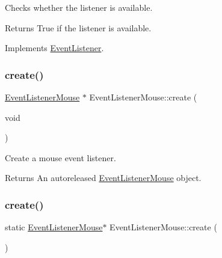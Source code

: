 Checks whether the listener is available.

\begin{DoxyReturn}{Returns}
True if the listener is available. 
\end{DoxyReturn}


Implements \hyperlink{classEventListener_adf9e4eb37ea6e94c05f4d1b6594bd35e}{Event\+Listener}.

\mbox{\label{classEventListenerMouse_ab30f113b7c3b6c4feaf3eb989e5755c9}} 
\subsubsection{\texorpdfstring{create()}{create()}\hspace{0.1cm}{\footnotesize\ttfamily [1/2]}}
{\footnotesize\ttfamily \hyperlink{classEventListenerMouse}{Event\+Listener\+Mouse} $\ast$ Event\+Listener\+Mouse\+::create (\begin{DoxyParamCaption}\item[{void}]{ }\end{DoxyParamCaption})\hspace{0.3cm}{\ttfamily [static]}}

Create a mouse event listener.

\begin{DoxyReturn}{Returns}
An autoreleased \hyperlink{classEventListenerMouse}{Event\+Listener\+Mouse} object. 
\end{DoxyReturn}
\mbox{\label{classEventListenerMouse_a4c1fbbe54ebab508cf418cd5f42af6b4}} 
\subsubsection{\texorpdfstring{create()}{create()}\hspace{0.1cm}{\footnotesize\ttfamily [2/2]}}
{\footnotesize\ttfamily static \hyperlink{classEventListenerMouse}{Event\+Listener\+Mouse}$\ast$ Event\+Listener\+Mouse\+::create (\begin{DoxyParamCaption}{ }\end{DoxyParamCaption})\hspace{0.3cm}{\ttfamily [static]}}


